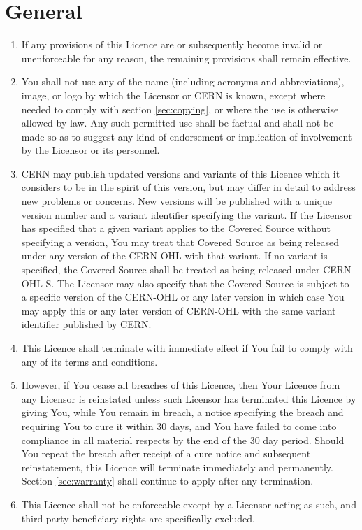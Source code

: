 \documentclass[10pt, a4paper]{article}
\begin{document}
\section{General}
\label{sec:general}
\begin{enumerate}[label=\ref*{sec:general}.\arabic*]

\item
If any provisions of this Licence are or subsequently become invalid or unenforceable for any reason, the remaining provisions shall remain effective.
\item
You shall not use any of the name (including acronyms and abbreviations), image, or logo by which the Licensor or CERN is known, except where  needed to  comply with section \ref*{sec:copying}, or where the use is otherwise allowed by law. Any such permitted use shall be factual and shall not be made so as to suggest any kind of endorsement or implication of involvement by the Licensor or its personnel.
\item
\label{subsec:versions}
CERN may publish updated versions and variants of this Licence which it considers to be in the spirit of this version, but may differ in detail to address new problems or concerns. New versions will be published with a unique version number and a variant identifier specifying the variant. If the Licensor has specified that a given variant applies to the Covered Source without specifying a version, You may treat that Covered Source as being released under any version of the CERN-OHL with that variant. If no variant is specified, the Covered Source shall be treated as being released under CERN-OHL-S. The Licensor may also specify that the Covered Source is subject to a specific version of the CERN-OHL or any later version in which case You may apply this or any later version of CERN-OHL with the same variant identifier published by CERN. 

\item
\label{subsec:termination}
This Licence shall terminate with immediate effect if You fail to comply with any of its terms and conditions. 
\item
However, if You cease all breaches of this Licence, then Your Licence from any Licensor is reinstated unless such Licensor has terminated this Licence by giving You, while You remain in breach, a notice specifying the breach and requiring You to cure it within 30 days, and You have failed to come into compliance in all material respects by the end of the 30 day period. Should You repeat the breach after receipt of a cure notice and subsequent reinstatement, this Licence will terminate immediately and permanently. Section \ref*{sec:warranty} shall continue to apply after any termination.

\item
This Licence shall not be enforceable except by a Licensor acting as such, and third party beneficiary rights are specifically excluded.
\end{enumerate}
\end{document}
